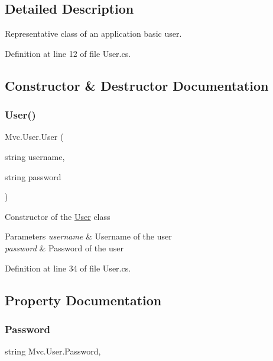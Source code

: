 \subsection{Detailed Description}
Representative class of an application basic user. 



Definition at line 12 of file User.\+cs.



\subsection{Constructor \& Destructor Documentation}
\mbox{\label{class_mvc_1_1_user_a951af2a43011db1d2deb581e50a9e6ee}} 
\subsubsection{\texorpdfstring{User()}{User()}}
{\footnotesize\ttfamily Mvc.\+User.\+User (\begin{DoxyParamCaption}\item[{string}]{username,  }\item[{string}]{password }\end{DoxyParamCaption})}



Constructor of the \hyperlink{class_mvc_1_1_user}{User} class 


\begin{DoxyParams}{Parameters}
{\em username} & Username of the user\\
\hline
{\em password} & Password of the user\\
\hline
\end{DoxyParams}


Definition at line 34 of file User.\+cs.



\subsection{Property Documentation}
\mbox{\label{class_mvc_1_1_user_af53cf70ba371cde36137573c906981a7}} 
\subsubsection{\texorpdfstring{Password}{Password}}
{\footnotesize\ttfamily string Mvc.\+User.\+Password\hspace{0.3cm}{\ttfamily [get]}, {\ttfamily [set]}}



